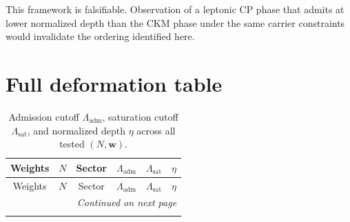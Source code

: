 \documentclass[aps,prd,twocolumn,nofootinbib,superscriptaddress]{revtex4-2}
\begin{document}
This framework is falsifiable. Observation of a leptonic CP phase that admits at lower normalized depth than the CKM phase under the same carrier constraints would invalidate the ordering identified here.

\appendix
\section{Full deformation table}
\label{app:fulltable}

\begin{longtable}{cccccc}
\caption{Admission cutoff $\Lambda_{\mathrm{adm}}$, saturation cutoff $\Lambda_{\mathrm{sat}}$, and normalized depth $\eta$ across all tested $(N,\mathbf{w})$.}\\
\toprule
Weights & $N$ & Sector & $\Lambda_{\mathrm{adm}}$ & $\Lambda_{\mathrm{sat}}$ & $\eta$ \\
\midrule
\endfirsthead

\toprule
Weights & $N$ & Sector & $\Lambda_{\mathrm{adm}}$ & $\Lambda_{\mathrm{sat}}$ & $\eta$ \\
\midrule
\endhead

\midrule
\multicolumn{6}{r}{\emph{Continued on next page}}\\
\endfoot

\bottomrule
\endlastfoot



\end{longtable}
\end{document}
